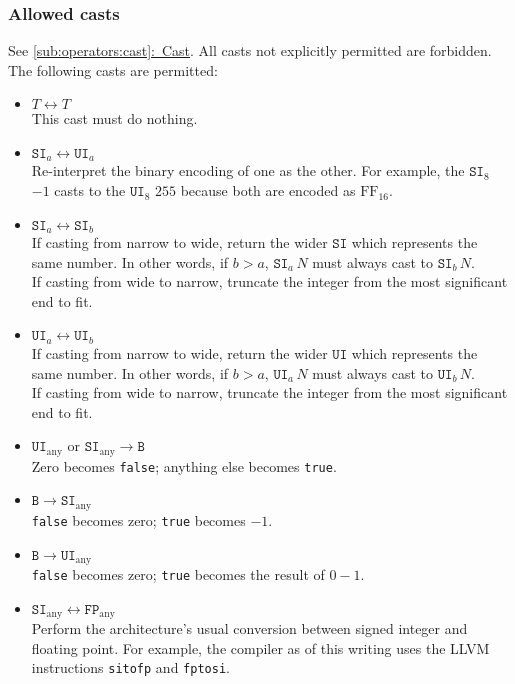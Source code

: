 \documentclass{article}
\newcommand{\R}[1]{\mathtt{#1}}
\newcommand{\both}{\leftrightarrow}
\newcommand{\textref}[2]{\hyperref[#1]{\underline{\ref*{#1}:~#2}}}
\begin{document}
\subsubsection{Allowed casts}
See \textref{sub:operators:cast}{Cast}.
All casts not explicitly permitted are forbidden. The following casts are
permitted:
\begin{itemize}
  \item{$T \both T$ \\
    This cast must do nothing.}
  \item{$\R{SI}_a \both \R{UI}_a$ \\
    Re-interpret the binary encoding of one as the other. For example,
    the $\R{SI}_8$ $-1$ casts to the $\R{UI}_8$ $255$ because both are
    encoded as $\mathrm{FF}_{16}$.}
  \item{$\R{SI}_a \both \R{SI}_b$ \\
    If casting from narrow to wide, return the wider $\R{SI}$ which represents
    the same number. In other words, if $b > a$, $\R{SI}_a\,N$ must always cast
    to $\R{SI}_b\,N$. \\
    If casting from wide to narrow, truncate the integer from the most
    significant end to fit.}
  \item{$\R{UI}_a \both \R{UI}_b$ \\
    If casting from narrow to wide, return the wider $\R{UI}$ which represents
    the same number. In other words, if $b > a$, $\R{UI}_a\,N$ must always cast
    to $\R{UI}_b\,N$. \\
    If casting from wide to narrow, truncate the integer from the most
    significant end to fit.}
  \item{$\R{UI}_\mathrm{any} \textrm{ or } \R{SI}_\mathrm{any} \to \R{B}$ \\
    Zero becomes \texttt{false}; anything else becomes \texttt{true}.}
  \item{$\R{B} \to \R{SI}_\mathrm{any}$ \\
    \texttt{false} becomes zero; \texttt{true} becomes $-1$.}
  \item{$\R{B} \to \R{UI}_\mathrm{any}$ \\
    \texttt{false} becomes zero; \texttt{true} becomes the result of $0 - 1$.}
  \item{$\R{SI}_\mathrm{any} \both \R{FP}_\mathrm{any}$ \\
    Perform the architecture's usual conversion between signed integer and
    floating point. For example, the compiler as of this writing uses the
    LLVM instructions \texttt{sitofp} and \texttt{fptosi}.}

\end{itemize}
\end{document}
